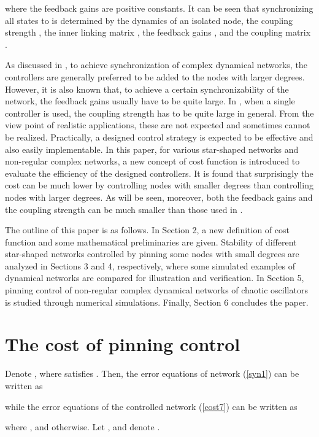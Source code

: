\documentclass[11pt]{article}
\def\dref#1{(\ref{#1})}
\begin{document}
where the feedback gains  are positive constants. It
can be seen that synchronizing all states  to  is
determined by the dynamics of an isolated node, the coupling
strength , the inner linking matrix , the feedback
gains , and the coupling matrix .

As discussed in \cite{r8,jia55,jia57}, to achieve synchronization of
complex dynamical networks, the controllers are generally preferred
to be added to the nodes with larger degrees. However, it is also
known that, to achieve a certain synchronizability of the network,
the feedback gains  usually have to be quite large.
In \cite{jia53}, when a single controller is used, the coupling
strength  has to be quite large in general. From the view point
of realistic applications, these are not expected and sometimes
cannot be realized. Practically, a designed control strategy is
expected to be effective and also easily implementable. In this
paper, for various star-shaped networks and non-regular complex
networks, a new concept of cost function is introduced to evaluate
the efficiency of the designed controllers. It is found that
surprisingly the cost can be much lower by controlling nodes with
smaller degrees than controlling nodes with larger degrees. As will
be seen, moreover, both the feedback gains  and the
coupling strength  can be much smaller than those used in
\cite{jia53,r8,jia55,jia57}.

The outline of this paper is as follows. In Section 2, a new
definition of cost function and some mathematical preliminaries are
given. Stability of different star-shaped networks controlled by
pinning some nodes with small degrees are analyzed in Sections 3 and
4, respectively, where some simulated examples of dynamical networks
are compared for illustration and verification. In Section 5,
pinning control of non-regular complex dynamical networks of chaotic
oscillators is studied through numerical simulations. Finally,
Section 6 concludes the paper.

\section{The cost of pinning control}

\quad Denote , where  satisfies . Then, the error equations of network \dref{syn1} can
be written as

while the error equations of the controlled network \dref{cost7} can
be written as

where
,
and  otherwise. Let
, and denote
.
\end{document}
